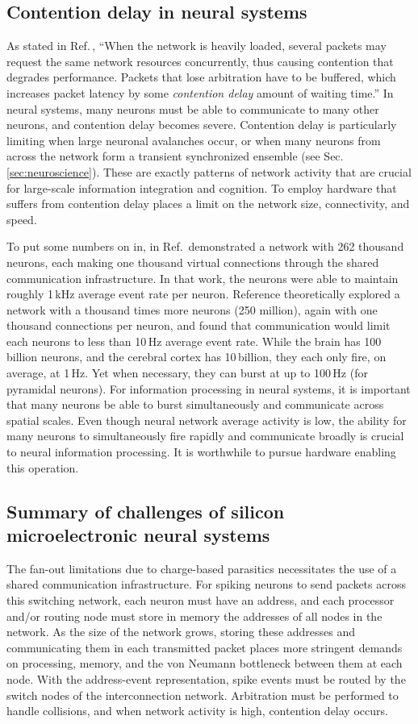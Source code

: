 \documentclass[twocolumn]{article}
\begin{document}
\subsection{Contention delay in neural systems}
As stated in Ref.\,\cite{hepa2012}, ``When the network is heavily loaded, several packets may request the same network resources concurrently, thus causing contention that degrades performance. Packets that lose arbitration have to be buffered, which increases packet latency by some \textit{contention delay} amount of waiting time.'' In neural systems, many neurons must be able to communicate to many other neurons, and contention delay becomes severe. Contention delay is particularly limiting when large neuronal avalanches occur, or when many neurons from across the network form a transient synchronized ensemble (see Sec.\,\ref{sec:neuroscience}). These are exactly patterns of network activity that are crucial for large-scale information integration and cognition. To employ hardware that suffers from contention delay places a limit on the network size, connectivity, and speed. 

To put some numbers on in, in Ref.\,\cite{payu2017} demonstrated a network with 262 thousand neurons, each making one thousand virtual connections through the shared communication infrastructure. In that work, the neurons were able to maintain roughly 1\,kHz average event rate per neuron. Reference \cite{kuwa2017} theoretically explored a network with a thousand times more neurons (250 million), again with one thousand connections per neuron, and found that communication would limit each neurons to less than 10\,Hz average event rate. While the brain has 100\,billion neurons, and the cerebral cortex has 10\,billion, they each only fire, on average, at 1\,Hz. Yet when necessary, they can burst at up to 100\,Hz (for pyramidal neurons). For information processing in neural systems, it is important that many neurons be able to burst simultaneously and communicate across spatial scales. Even though neural network average activity is low, the ability for many neurons to simultaneously fire rapidly and communicate broadly is crucial to neural information processing. It is worthwhile to pursue hardware enabling this operation. 

\subsection{Summary of challenges of silicon microelectronic neural systems}
The fan-out limitations due to charge-based parasitics necessitates the use of a shared communication infrastructure. For spiking neurons to send packets across this switching network, each neuron must have an address, and each processor and/or routing node must store in memory the addresses of all nodes in the network. As the size of the network grows, storing these addresses and communicating them in each transmitted packet places more stringent demands on processing, memory, and the von Neumann bottleneck between them at each node. With the address-event representation, spike events must be routed by the switch nodes of the interconnection network. Arbitration must be performed to handle collisions, and when network activity is high, contention delay occurs. 
\end{document}
